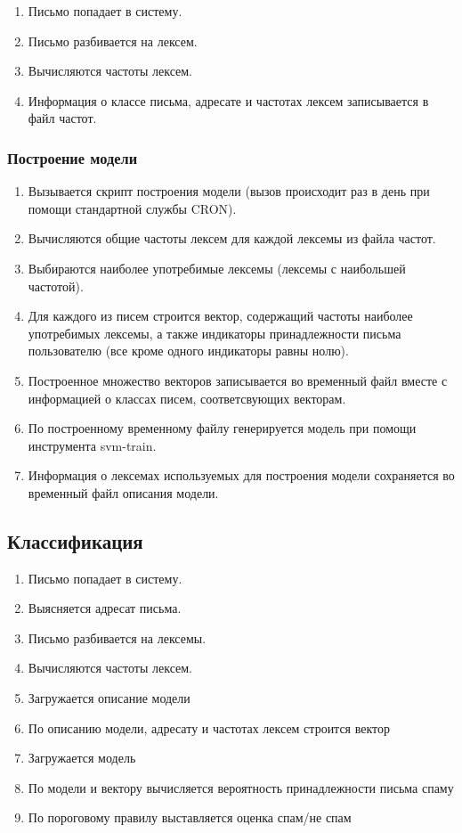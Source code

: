 \begin{enumerate}
    \item Письмо попадает в систему.
    \item Письмо разбивается на лексем.
    \item Вычисляются частоты лексем.
    \item Информация о классе письма, адресате и частотах лексем записывается в файл частот.
\end{enumerate}

\subsubsection{Построение модели}
\begin{enumerate}
    \item Вызывается скрипт построения модели (вызов происходит раз в день при помощи стандартной службы CRON).
    \item Вычисляются общие частоты лексем для каждой лексемы из файла частот.
    \item Выбираются наиболее употребимые лексемы (лексемы с наибольшей частотой).
    \item Для каждого из писем строится вектор, содержащий частоты наиболее употребимых лексемы, а также индикаторы принадлежности письма пользователю (все кроме одного индикаторы равны нолю).
    \item Построенное множество векторов записывается во временный файл вместе с информацией о классах писем,  соответсвующих векторам.
    \item По построенному временному файлу генерируется модель при помощи инструмента svm-train.
    \item Информация о лексемах используемых для построения модели сохраняется во временный файл описания модели.
\end{enumerate}

\subsection{Классификация}
\begin{enumerate}
    \item Письмо попадает в систему.
    \item Выясняется адресат письма.
    \item Письмо разбивается на лексемы.
    \item Вычисляются частоты лексем.
    \item Загружается описание модели
    \item По описанию модели, адресату и частотах лексем строится вектор
    \item Загружается модель
    \item По модели и вектору вычисляется вероятность принадлежности письма спаму
    \item По пороговому правилу выставляется оценка спам/не спам
\end{enumerate}


